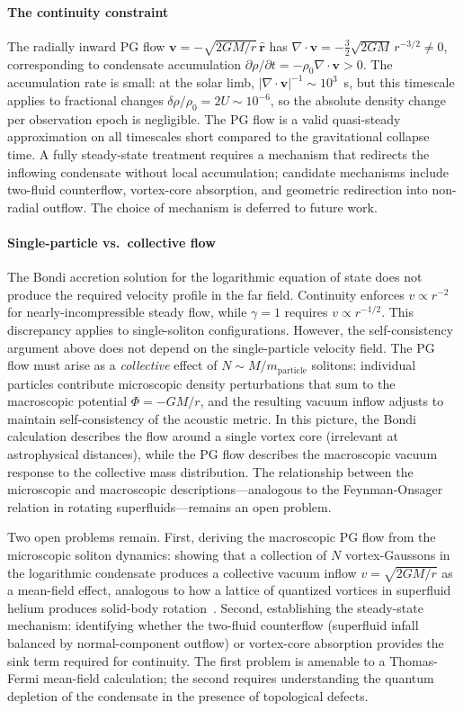 \documentclass[12pt, a4paper]{article}
\begin{document}
\paragraph{The continuity constraint}
The radially inward PG flow $\mathbf{v} = -\sqrt{2GM/r}\,\hat{\mathbf{r}}$ has $\nabla \cdot \mathbf{v} = -\tfrac{3}{2}\sqrt{2GM}\,r^{-3/2} \neq 0$, corresponding to condensate accumulation $\partial\rho/\partial t = -\rho_0 \nabla \cdot \mathbf{v} > 0$. The accumulation rate is small: at the solar limb, $|\nabla \cdot \mathbf{v}|^{-1} \sim 10^3$~s, but this timescale applies to fractional changes $\delta\rho/\rho_0 = 2U \sim 10^{-6}$, so the absolute density change per observation epoch is negligible. The PG flow is a valid quasi-steady approximation on all timescales short compared to the gravitational collapse time. A fully steady-state treatment requires a mechanism that redirects the inflowing condensate without local accumulation; candidate mechanisms include two-fluid counterflow, vortex-core absorption, and geometric redirection into non-radial outflow. The choice of mechanism is deferred to future work.

\paragraph{Single-particle vs.\ collective flow}
\label{par:collective_flow}
The Bondi accretion solution for the logarithmic equation of state does not produce the required velocity profile in the far field. Continuity enforces $v \propto r^{-2}$ for nearly-incompressible steady flow, while $\gamma = 1$ requires $v \propto r^{-1/2}$. This discrepancy applies to single-soliton configurations. However, the self-consistency argument above does not depend on the single-particle velocity field. The PG flow must arise as a \emph{collective} effect of $N \sim M/m_{\mathrm{particle}}$ solitons: individual particles contribute microscopic density perturbations that sum to the macroscopic potential $\Phi = -GM/r$, and the resulting vacuum inflow adjusts to maintain self-consistency of the acoustic metric. In this picture, the Bondi calculation describes the flow around a single vortex core (irrelevant at astrophysical distances), while the PG flow describes the macroscopic vacuum response to the collective mass distribution. The relationship between the microscopic and macroscopic descriptions---analogous to the Feynman-Onsager relation in rotating superfluids---remains an open problem.

Two open problems remain. First, deriving the macroscopic PG flow from the microscopic soliton dynamics: showing that a collection of $N$ vortex-Gaussons in the logarithmic condensate produces a collective vacuum inflow $v = \sqrt{2GM/r}$ as a mean-field effect, analogous to how a lattice of quantized vortices in superfluid helium produces solid-body rotation~\cite{volovik_2003}. Second, establishing the steady-state mechanism: identifying whether the two-fluid counterflow (superfluid infall balanced by normal-component outflow) or vortex-core absorption provides the sink term required for continuity. The first problem is amenable to a Thomas-Fermi mean-field calculation; the second requires understanding the quantum depletion of the condensate in the presence of topological defects.
\end{document}
